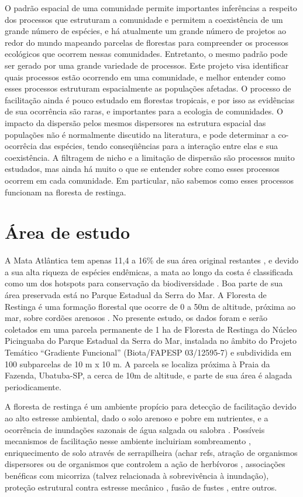 \documentclass[twoside,12pt,a4paper]{report}
\begin{document}
O padrão espacial de uma comunidade permite importantes inferências a respeito dos processos que
estruturam a comunidade e permitem a coexistência de um grande número de espécies, e há atualmente
um grande número de projetos ao redor do mundo mapeando parcelas de florestas para
compreender os processos ecológicos que ocorrem nessas comunidades. Entretanto, o mesmo padrão pode ser gerado por uma grande variedade de
processos. Este projeto visa identificar quais processos estão ocorrendo em uma comunidade, e
melhor entender como esses processos estruturam espacialmente as populações afetadas. 
O processo de facilitação ainda é pouco estudado em florestas tropicais, e por
isso as evidências de sua ocorrência são raras, e importantes para a ecologia de comunidades.
O impacto da dispersão pelos mesmos dispersores na estrutura espacial das populações não é
normalmente discutido na literatura, e pode determinar a co-ocorrêcia das espécies, tendo
conseqüências para a interação entre elas e sua coexistência. A filtragem de nicho e a
limitação de dispersão são processos muito estudados, mas ainda há muito o que se entender
sobre como esses processos ocorrem em cada comunidade. Em particular, não sabemos como esses
processos funcionam na floresta de restinga.

\section{Área de estudo}
A Mata Atlântica tem apenas 11,4 a 16\% de sua área original restantes \citep{Ribeiro2009}, e
devido a sua alta riqueza de espécies endêmicas, a mata ao longo da costa é classificada como um dos
hotspots para conservação da biodiversidade \citep{Myers2000}. Boa parte de sua área preservada
está no Parque Estadual da Serra do Mar. A Floresta de Restinga é uma formação florestal que ocorre
de 0 a 50m de altitude, próxima ao mar, sobre cordões arenosos \citep{Joly2008}. No presente
estudo, os dados foram e serão coletados em uma parcela permanente de 1 ha de Floresta de Restinga
do Núcleo Picinguaba do Parque Estadual da Serra do Mar, instalada no âmbito do Projeto Temático
“Gradiente Funcional” (Biota/FAPESP 03/12595-7) e subdividida em 100 subparcelas de 10 m x 10 m. A
parcela se localiza próxima à Praia da Fazenda, Ubatuba-SP, a cerca de 10m de altitude, e parte de
sua área é alagada periodicamente.

A floresta de restinga é um ambiente propício para detecção de facilitação devido ao alto estresse
ambiental, dado o solo arenoso e pobre em nutrientes, e a ocorrência de inundações sazonais de água
salgada ou salobra \citep{TODO refs}. 
Possíveis mecanismos de facilitação nesse ambiente incluiriam sombreamento
\citep{Castanho2014}, enriquecimento de solo através de serrapilheira (achar refs, atração de
organismos dispersores \citep{achar refs CallawayBook} ou de organismos que controlem a ação de
herbívoros \citep{refs}, associações benéficas com micorriza \citep{Simard1997} (talvez
relacionada à sobrevivência à inundação\citep{Fougnies2007}), proteção
estrutural contra estresse mecânico \citep{refs}, fusão de fustes \citep{McIntire2011}, entre
outros.
\end{document}
